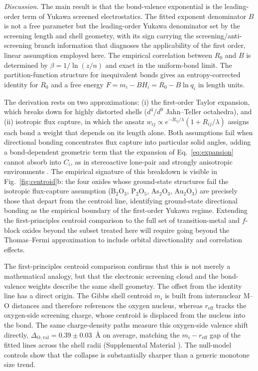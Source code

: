 \documentclass[aps,prmaterials,twocolumn,10pt,superscriptaddress,floatfix]{revtex4-2}
\newcommand{\runinsec}[1]{\medskip\emph{#1}}
\begin{document}
\runinsec{Discussion.} The main result is that the bond-valence
exponential is the leading-order term of Yukawa screened
electrostatics.  The fitted exponent denominator $B$ is not a free
parameter but the leading-order Yukawa denominator set by the
screening length and shell geometry, with its sign carrying the
screening/anti-screening branch information that diagnoses the applicability
of the first order, linear assumption employed here. The empirical
correlation between $R_0$ and $B$ is determined by
$\beta=1/\ln(z/n)$ and exact in the uniform-bond limit.  The
partition-function structure for inequivalent bonds gives an
entropy-corrected identity for $R_0$ and a free energy
$F=m_i-BH_i=R_0-B\ln q_i$ in length units.

The derivation rests on two approximations: (i) the first-order
Taylor expansion, which breaks down for highly distorted shells
($d^4$/$d^9$ Jahn--Teller octahedra), and (ii) isotropic flux
capture, in which the ansatz
$w_{ij}\propto e^{-R_{ij}/\lambda}(1+R_{ij}/\lambda)$ assigns each
bond a weight that depends on its length alone.  Both assumptions
fail when directional bonding concentrates flux capture into
particular solid angles, adding a bond-dependent geometric term that
the expansion of Eq.~\eqref{eq:expansion} cannot absorb into $C_i$,
as in stereoactive lone-pair and strongly anisotropic environments
\cite{Bosi2014,Brown2016}.  The empirical signature of this
breakdown is visible in Fig.~\ref{fig:centroid}b: the four oxides
whose ground-state structures fail the isotropic flux-capture
assumption (B$_2$O$_3$, P$_2$O$_5$, As$_2$O$_3$, Au$_2$O$_3$) are
precisely those that depart from the centroid line, identifying
ground-state directional bonding as the empirical boundary of the
first-order Yukawa regime.  Extending the first-principles centroid
comparison to the full set of transition-metal and $f$-block oxides
beyond the subset treated here will require going beyond the
Thomas--Fermi approximation to include orbital directionality and
correlation effects.

The first-principles centroid comparison confirms that this is not
merely a mathematical analogy, but that the electronic screening
cloud and the bond-valence weights describe the same shell geometry.
The offset from the identity line has a direct origin.  The Gibbs
shell centroid $m_i$ is built from internuclear M--O distances and
therefore references the oxygen nucleus, whereas $r_{\mathrm{eff}}$
tracks the oxygen-side screening charge, whose centroid is displaced
from the nucleus into the bond.  The same charge-density paths
measure this oxygen-side valence shift directly,
$\Delta_{\mathrm{O,val}}=0.39\pm0.03$~\AA{} on average, matching the
$m_i-r_{\mathrm{eff}}$ gap of the fitted lines across the shell
radii (Supplemental Material \cite{suppmat}).  The null-model
controls show that the collapse is substantially sharper than a
generic monotone size trend.
\end{document}
